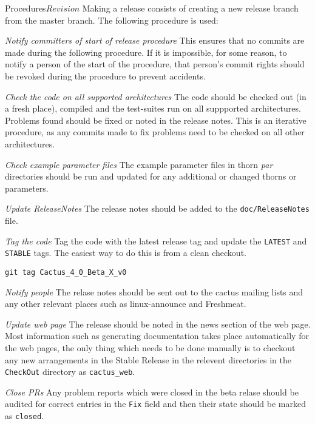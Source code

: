 \begin{cactuspart}{2}{Procedures}{}{$Revision$}
Making a release consists of creating a new release branch from the
master branch.  The following procedure is used:

\begin{Lentry}
\item[{\em Notify committers of start of release procedure}]
This ensures that no commits are made during the following procedure.
If it is impossible, for some reason, to notify a person of the start
of the procedure, that person's commit rights should be revoked during 
the procedure to prevent accidents.
\item[{\em Check the code on all supported architectures}]
The code should be checked out (in a fresh place), compiled and the
test-suites run on all suppported architectures.  Problems found
should be fixed or noted in the release notes.  This is an iterative
procedure, as any commits made to fix problems need to be checked on
all other architectures.
\item[{\em Check example parameter files}]
The example parameter files in thorn {\em par} directories should be
run and updated for any additional or changed thorns or parameters.
\item[{\em Update ReleaseNotes}]
The release notes should be added to the \verb|doc/ReleaseNotes| file.
\item[{\em Tag the code}]
Tag the code with the latest release tag and update the {\tt LATEST}
and {\tt STABLE} tags.  The easiest way to do this is from a clean
checkout.
\begin{verbatim}
git tag Cactus_4_0_Beta_X_v0
\end{verbatim}

\item[{\em Notify people}]
The relase notes should be sent out to the cactus mailing lists and
any other relevant places such as linux-announce and Freshmeat.
\item[{\em Update web page}]
The release should be noted in the news section of the web page.
Most information such as generating documentation takes place automatically 
for the web pages, the only thing which needs to be done manually is to
checkout any new arrangements in the Stable Release in the relevent 
directories in the {\tt CheckOut} directory as {\tt cactus\_web}.
\item[{\em Close PRs}]
Any problem reports which were closed in the beta relase should be
audited for correct entries in the {\tt Fix} field and then their
state should be marked as {\tt closed}.
\end{Lentry}


\end{cactuspart}

